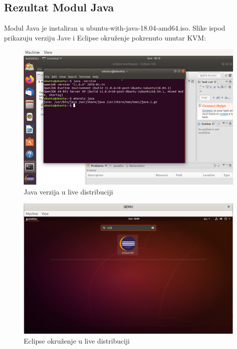 \documentclass[12pt,vi]{mitthesis}
\begin{document}
\subsection*{Rezultat Modul Java}
\indent
Modul Java je instaliran u ubuntu-with-java-18.04-amd64.iso.
Slike ispod prikazuju verziju Jave i Eclipse okruženje pokrenuto unutar KVM:
\begin{figure}[!htb]
\centering
\includegraphics[width=\linewidth]{images/javaLive.png}
\caption{Java verzija u live distribuciji}
\end{figure}
\begin{figure}[!htb]
\centering
\includegraphics[width=\linewidth]{images/eclipseLive.png}
\caption{Eclipse okruženje u live distribuciji}
\end{figure}
\end{document}
